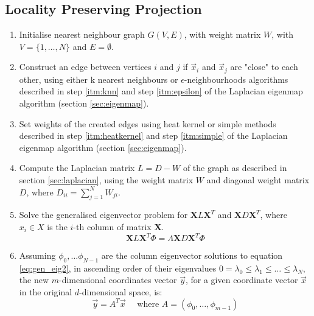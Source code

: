 \documentclass[a4paper, 11pt]{article}
\begin{document}
\subsection{Locality Preserving Projection}
\begin{enumerate}
	\item Initialise nearest neighbour graph $G(V,E)$, with weight matrix $W$, with $V = \{1, \dots , N\}$ and $E = \emptyset$. 

	\item Construct an edge between vertices $i$ and $j$ if $\vec{x}_i$ and $\vec{x}_j$ are "close" to each other, using either k nearest neighbours or $\epsilon$-neighbourhoods algorithms described in step \ref{itm:knn}  and step \ref{itm:epsilon} of the Laplacian eigenmap algorithm (section \ref{sec:eigenmap}).

	\item Set weights of the created edges using heat kernel or 	simple methods described in step \ref{itm:heatkernel} and 		step \ref{itm:simple} of the Laplacian eigenmap algorithm (section \ref{sec:eigenmap}).


	\item Compute the Laplacian matrix $L = D - W$ of the graph as described in section \ref{sec:laplacian}, using the weight matrix $W$ and diagonal weight matrix  $D$, where $D_{ii} = \sum_{j=1}^N W_{ji}$.


	\item Solve the generalised eigenvector problem for $\boldsymbol{X}L\boldsymbol{X}^T$ and $\boldsymbol{X}D\boldsymbol{X}^T$, where $x_i \in X$ is the $i$-th column of matrix $\boldsymbol{X}$.
	\begin{equation} \label{eq:gen_eig2}
	\boldsymbol{X}L\boldsymbol{X}^T\Phi = \Lambda \boldsymbol{X}D\boldsymbol{X}^T \Phi
	\end{equation}
	
	\item Assuming $\phi_0, \dots \phi_{N-1}$ are the column eigenvector solutions to equation \ref{eq:gen_eig2}, in ascending order of their eigenvalues $0=\lambda_0 \leq \lambda_1 \leq \dots \leq \lambda_N$, the new $m$-dimensional  coordinates vector $\vec{y}$, for a given coordinate vector $\vec{x}$ in the original $d$-dimensional space, is:
	\begin{equation}
	\vec{y} = A^T\vec{x} \quad \text{ where } A = (\phi_0, \dots , \phi_{m-1})
	\end{equation}	
\end{enumerate}
\end{document}
